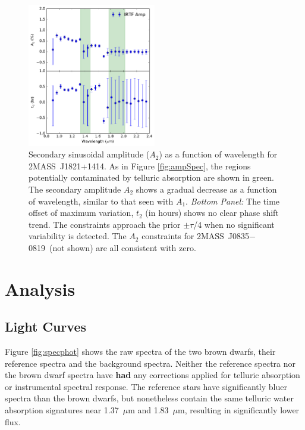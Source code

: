 \documentclass[twocolumn]{aastex6}
\newcommand{\sha}{2MASS~J0835$-$0819}
\newcommand{\shb}{2MASS~J1821+1414}
\begin{document}
\begin{figure}
\begin{centering}
\includegraphics[width=0.5\textwidth]{amp_vs_wavl_j1821_a2_t2.pdf}
\caption{Secondary sinusoidal amplitude ($A_2$) as a function of wavelength for \shb.
As in Figure \ref{fig:ampSpec}, the regions potentially contaminated by telluric absorption are shown in green.
The secondary amplitude $A_2$ shows a gradual decrease as a function of wavelength, similar to that seen with $A_1$.
{\it Bottom Panel:} The time offset of maximum variation, $t_2$ (in hours) shows no clear phase shift trend.
The constraints approach the prior $\pm \tau$/4 when no significant variability is detected.
The $A_2$ constraints for \sha\ (not shown) are all consistent with zero.}\label{fig:amp2Spec}
\end{centering}
\end{figure}



\section{Analysis}\label{sec:analysis}

\subsection{Light Curves}

Figure \ref{fig:specphot} shows the raw spectra of the two brown dwarfs, their reference spectra and the background spectra.
Neither the reference spectra nor the brown dwarf spectra have \textbf{had} any corrections applied for telluric absorption or instrumental spectral response.
The reference stars have significantly bluer spectra than the brown dwarfs, but nonetheless contain the same telluric water absorption signatures
near 1.37~$\mu$m and 1.83~$\mu$m, resulting in significantly lower flux.
\end{document}
